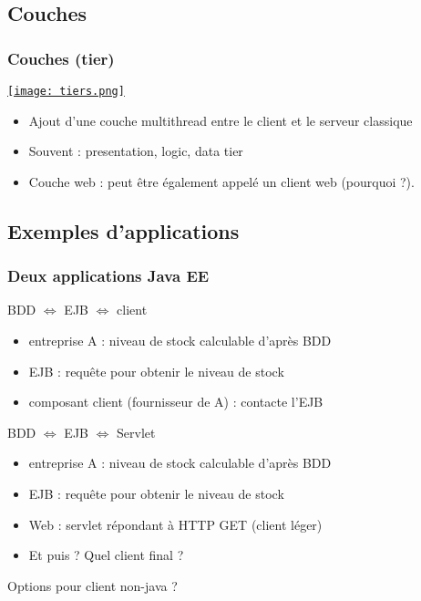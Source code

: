 \documentclass[english, french]{beamer}
\begin{document}
\subsection{Couches}
\begin{frame}
	\frametitle{Couches (\og{}tier\fg{})}
	\begin{minipage}{\columnwidth*\real{0.6}}
		\href{https://docs.oracle.com/javaee/7/tutorial/overview003.htm}{\texttt{[image: tiers.png]}}
	\end{minipage}%
	\begin{minipage}{\columnwidth*\real{0.4}}
		\begin{itemize}
			\item Ajout d’une couche multithread entre le client et le serveur classique
			\item Souvent : presentation, logic, data tier
			\item Couche web : peut être également appelé un client web (pourquoi ?).
		\end{itemize}
	\end{minipage}
\end{frame}

\subsection{Exemples d’applications}
\begin{frame}
	\frametitle{Deux applications Java EE}
	\begin{block}{BDD $⇔$ EJB $⇔$ client}
		\begin{itemize}
			\item entreprise A : niveau de stock calculable d’après BDD
			\item EJB : requête pour obtenir le niveau de stock
			\item composant client (fournisseur de A) : contacte l’EJB
		\end{itemize}		
	\end{block}
	
	\begin{block}{BDD $⇔$ EJB $⇔$ Servlet}
		\begin{itemize}
			\item entreprise A : niveau de stock calculable d’après BDD
			\item EJB : requête pour obtenir le niveau de stock
			\item Web : servlet répondant à HTTP GET (client léger)
			\item Et puis ? Quel client final ?
		\end{itemize}		
	\end{block}
	
	Options pour client non-java ?
\end{frame}
\end{document}

